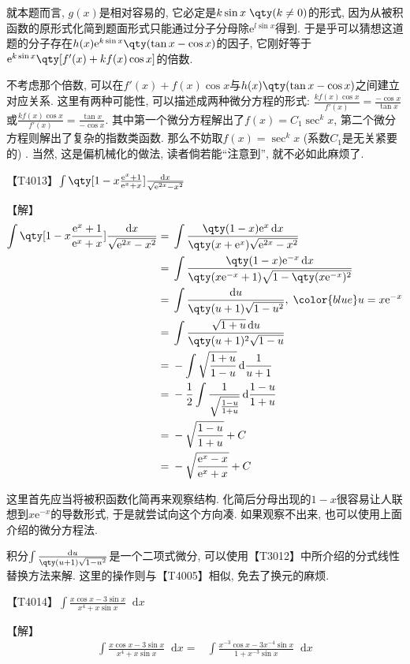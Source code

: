 \documentclass{ctexbook}
\newcommand{\e}{\mathrm{e}}
\newcommand*{\dif}{\mathop{}\!\mathrm{d}}
\begin{document}
{{就本题而言, $g(x)$是相对容易的, 它必定是$k\sin{x}\;\qty(k\ne0)$的形式, 因为从被积函数的原形式化简到题面形式只能通过分子分母除$\e^{l\sin{x}}$得到. 于是乎可以猜想这道题的分子存在$h(x)\e^{k\sin{x}}\qty(\tan{x}-\cos{x})$的因子, 它刚好等于$\e^{k\sin{x}}\qty[f'(x)+kf(x)\cos{x}]$的倍数. \par
不考虑那个倍数, 可以在$f'(x)+f(x)\cos{x}$与$h(x)\qty(\tan{x}-\cos{x})$之间建立对应关系. 这里有两种可能性, 可以描述成两种微分方程的形式: $\frac{kf(x)\cos{x}}{f'(x)}=\frac{-\cos{x}}{\tan{x}}$或$\frac{kf(x)\cos{x}}{f'(x)}=\frac{\tan{x}}{-\cos{x}}$. 其中第一个微分方程解出了$f(x)=C_{1}\sec^{k}{x}$, 第二个微分方程则解出了复杂的指数类函数. 那么不妨取$f(x)=\sec^{k}{x}$ (系数$C_{1}$是无关紧要的) . 当然, 这是偏机械化的做法, 读者倘若能“注意到”, 就不必如此麻烦了. \par}
【T4013】$\int\qty[1-x\frac{\e^{x}+1}{\e^{x}+x}]\frac{\dif{x}}{\sqrt{\e^{2x}-x^{2}}}$\par
【解】
\begin{align*}
\int\qty[1-x\frac{\e^{x}+1}{\e^{x}+x}]\frac{\dif{x}}{\sqrt{\e^{2x}-x^{2}}}={}&\int\frac{\qty(1-x)\e^{x}\dif{x}}{\qty(x+\e^{x})\sqrt{\e^{2x}-x^{2}}}\\
={}&\int\frac{\qty(1-x)\e^{-x}\dif{x}}{\qty(x\e^{-x}+1)\sqrt{1-\qty(x\e^{-x})^{2}}}\\
={}&\int\frac{\dif{u}}{\qty(u+1)\sqrt{1-u^{2}}},\;{\color{blue}u=x\e^{-x}}\\
={}&\int\frac{\sqrt{1+u}\dif{u}}{\qty(u+1)^{2}\sqrt{1-u}}\\
={}&-\int\sqrt{\frac{1+u}{1-u}}\dif{\frac{1}{u+1}}\\
={}&-\frac{1}{2}\int\frac{1}{\sqrt{\frac{1-u}{1+u}}}\dif{\frac{1-u}{1+u}}\\
={}&-\sqrt{\frac{1-u}{1+u}}+C\\
={}&-\sqrt{\frac{\e^{x}-x}{\e^{x}+x}}+C
\end{align*}\par
{\kaishu 这里首先应当将被积函数化简再来观察结构. 化简后分母出现的$1-x$很容易让人联想到$x\e^{-x}$的导数形式, 于是就尝试向这个方向凑. 如果观察不出来, 也可以使用上面介绍的微分方程法. \par
积分$\int\frac{\dif{u}}{\qty(u+1)\sqrt{1-u^{2}}}$是一个二项式微分, 可以使用{\color{red}【T3012】}中所介绍的分式线性替换方法来解. 这里的操作则与【T4005】相似, 免去了换元的麻烦. \par}
【T4014】$\int\frac{x\cos{x}-3\sin{x}}{x^{4}+x\sin{x}}\dif{x}$\par
【解】
\begin{align*}
\int\frac{x\cos{x}-3\sin{x}}{x^{4}+x\sin{x}}\dif{x}={}&\int\frac{x^{-3}\cos{x}-3x^{-4}\sin{x}}{1+x^{-3}\sin{x}}\dif{x}\\

\end{align*}}
\end{document}
